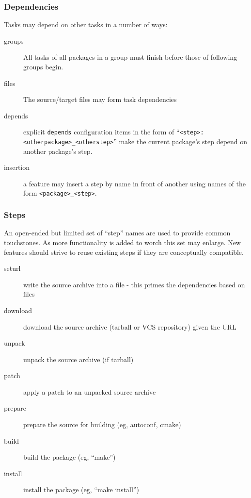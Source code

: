 \documentclass[xcolor=dvipsnames]{beamer}
\begin{document}
\begin{frame}[fragile]
  \frametitle{Dependencies}
  Tasks may depend on other tasks in a number of ways:
  \begin{description}
  \item[groups] All tasks of all packages in a group must finish before those of following groups begin.
  \item[files] The source/target files may form task dependencies
  \item[depends] explicit \texttt{depends} configuration items in the form of ``\verb|<step>:<otherpackage>_<otherstep>|'' make the current package's step depend on another package's step.
  \item[insertion] a feature may insert a step by name in front of another using names of the form \verb|<package>_<step>|.
  \end{description}
\end{frame}

\begin{frame}
  \frametitle{Steps}

  An open-ended but limited set of ``step'' names are used to provide
  common touchstones.  As more functionality is added to worch this
  set may enlarge.  New features should strive to reuse existing steps
  if they are conceptually compatible.
  \begin{description}
  \item[seturl] write the source archive into a file - this primes the dependencies based on files
  \item[download] download the source archive (tarball or VCS repository) given the URL
  \item[unpack] unpack the source archive (if tarball)
  \item[patch] apply a patch to an unpacked source archive
  \item[prepare] prepare the source for building (eg, autoconf, cmake)
  \item[build] build the package (eg, ``make'')
  \item[install] install the package (eg, ``make install'')
  \end{description}

\end{frame}
\end{document}
